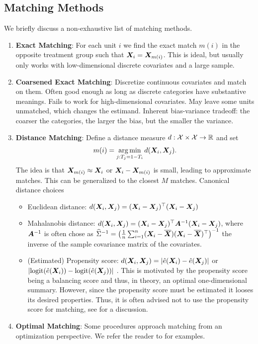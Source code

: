 \documentclass[11pt]{exam}
\begin{document}
\subsection{Matching Methods}
We briefly discuss a non-exhaustive list of matching methods.
\begin{enumerate}
    \item \textbf{Exact Matching}: For each unit $i$ we find the exact match $m(i)$ in the opposite treatment group such that $\bm{X}_i = \bm{X}_{m(i)}$. This is ideal, but usually only works with low-dimensional discrete covariates and a large sample.
    \item \textbf{Coarsened Exact Matching}: Discretize continuous covariates and match on them. Often good enough as long as discrete categories have substantive meanings. Fails to work for high-dimensional covariates. May leave some units unmatched, which changes the estimand. Inherent bias-variance tradeoff: the coarser the categories, the larger the bias, but the smaller the variance.
    \item \textbf{Distance Matching}:
    Define a distance measure $d: \mathcal{X} \times \mathcal{X} \to \mathbb{R}$ and set 
    \[
    m(i) = \operatorname*{arg\,min}_{j: T_j = 1 - T_i} d(\bm{X}_i, \bm{X}_j).
    \]
    The idea is that $\bm{X}_{m(i)} \approx \bm{X}_i$ or $\bm{X}_i - \bm{X}_{m(i)}$ is small, leading to approximate matches. This can be generalized to the closest $M$ matches. Canonical distance choices
    \begin{itemize}
        \item Euclidean distance: $d(\bm{X}_i, \bm{X}_j) = (\bm{X}_i - \bm{X}_j)^\top (\bm{X}_i - \bm{X}_j)$
        \item Mahalanobis distance: $d(\bm{X}_i, \bm{X}_j) = (\bm{X}_i - \bm{X}_j)^\top \bm{A}^{-1}(\bm{X}_i - \bm{X}_j)$, where $\bm{A}^{-1}$ is often chose as ${\widehat \Sigma}^{-1} = \left(\frac{1}{n} \sum_{i=1}^n (\bm{X}_i - \overline{\bm{X}}) (\bm{X}_i - \overline{\bm{X}})^\top\right)^{-1}$ the inverse of the sample covariance matrix of the covariates.
        \item (Estimated) Propensity score: $d(\bm{X}_i, \bm{X}_j) = |\hat e(\bm{X}_i) - \hat e(\bm{X}_j)|$ or $|\mathrm{logit}(\hat e(\bm{X}_i)) - \mathrm{logit}(\hat e(\bm{X}_j))|$ . This is motivated by the propensity score being a balancing score and thus, in theory, an optimal one-dimensional summary. However, since the propensity score must be estimated it looses its desired properties. Thus, it is often advised not to use the propensity score for matching, see \citet{king2019propensity} for a discussion.
    \end{itemize}
    \item \textbf{Optimal Matching}: Some procedures approach matching from an optimization perspective. We refer the reader to \citet{rosenbaum1989optimal, zubizarreta2014matching} for examples.
\end{enumerate}
\end{document}
